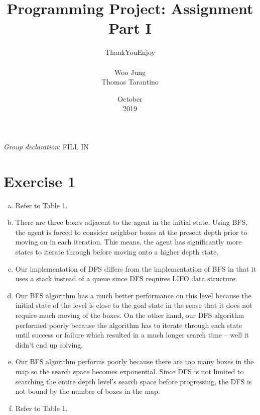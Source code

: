 \documentclass[12pt, letterpaper]{article}
\title{Programming Project: Assignment Part I}
\author{ThankYouEnjoy \\ \\ Woo Jung \\ Thomas Tarantino}
\date{October \\ 2019}
\begin{document}
\maketitle

\textit{Group declaration}: FILL IN 



\pagebreak
\section{Exercise 1}

\begin{enumerate}[(a)]
\item Refer to Table 1.

\item There are three boxes adjacent to the agent in the initial state. Using BFS, the agent is forced to consider neighbor boxes at the present depth prior to moving on in each iteration. This means, the agent has significantly more states to iterate through before moving onto a higher depth state. 

\item Our implementation of DFS differs from the implementation of BFS in that it uses a stack instead of a queue since DFS requires LIFO data structure. 

\item Our BFS algorithm has a much better performance on this level because the initial state of the level is close to the goal state in the sense that it does not require much moving of the boxes. On the other hand, our DFS algorithm performed poorly because the algorithm has to iterate through each state until success or failure which resulted in a much longer search time -- well it didn't end up solving.

\item Our BFS algorithm performs poorly because there are too many boxes in the map so the search space becomes exponential. Since DFS is not limited to searching the entire depth level's search space before progressing, the DFS is not bound by the number of boxes in the map. 

\item Refer to Table 1. 


\end{enumerate}
\end{document}
